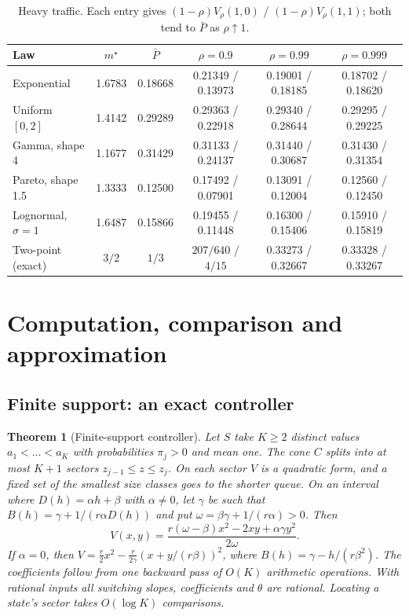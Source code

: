 \documentclass[11pt]{article}
\numberwithin{equation}{section}
\newtheorem{theorem}{Theorem}
\theoremstyle{definition}
\theoremstyle{remark}
\begin{document}
\begin{table}[h]
\centering\small
\caption{Heavy traffic. Each entry gives $(1-\rho)V_\rho(1,0)$ / $(1-\rho)V_\rho(1,1)$; both tend to $\bar P$ as $\rho\uparrow1$.}\label{tab:ht}
\begin{tabular}{@{}lccccc@{}}
\toprule
Law & $m^\star$ & $\bar P$ & $\rho=0.9$ & $\rho=0.99$ & $\rho=0.999$\\
\midrule
Exponential & 1.6783 & 0.18668 & 0.21349 / 0.13973 & 0.19001 / 0.18185 & 0.18702 / 0.18620\\
Uniform $[0,2]$ & 1.4142 & 0.29289 & 0.29363 / 0.22918 & 0.29340 / 0.28644 & 0.29295 / 0.29225\\
Gamma, shape 4 & 1.1677 & 0.31429 & 0.31133 / 0.24137 & 0.31440 / 0.30687 & 0.31430 / 0.31354\\
Pareto, shape 1.5 & 1.3333 & 0.12500 & 0.17492 / 0.07901 & 0.13091 / 0.12004 & 0.12560 / 0.12450\\
Lognormal, $\sigma=1$ & 1.6487 & 0.15866 & 0.19455 / 0.11448 & 0.16300 / 0.15406 & 0.15910 / 0.15819\\
Two-point (exact) & $3/2$ & $1/3$ & $207/640$ / $4/15$ & 0.33273 / 0.32667 & 0.33328 / 0.33267\\
\bottomrule
\end{tabular}
\end{table}

\section{Computation, comparison and approximation}\label{sec:approx}

\subsection{Finite support: an exact controller}

\begin{theorem}[Finite-support controller]\label{thm:finite}
Let $S$ take $K\ge2$ distinct values $a_1<\dots<a_K$ with probabilities $\pi_j>0$ and mean one. The cone $C$ splits into at most $K+1$ sectors $z_{j-1}\le z\le z_j$. On each sector $V$ is a quadratic form, and a fixed set of the smallest size classes goes to the shorter queue. On an interval where $D(h)=\alpha h+\beta$ with $\alpha\ne0$, let $\gamma$ be such that $B(h)=\gamma+1/(r\alpha D(h))$ and put $\omega=\beta\gamma+1/(r\alpha)>0$. Then
\begin{equation}\label{eq:F7}
V(x,y)=\frac{r(\omega-\beta)x^2-2xy+\alpha\gamma y^2}{2\omega}.
\end{equation}
If $\alpha=0$, then $V=\frac r2x^2-\frac{r}{2\gamma}(x+y/(r\beta))^2$, where $B(h)=\gamma-h/(r\beta^2)$. The coefficients follow from one backward pass of $O(K)$ arithmetic operations. With rational inputs all switching slopes, coefficients and $\theta$ are rational. Locating a state's sector takes $O(\log K)$ comparisons.
\end{theorem}
\end{document}

